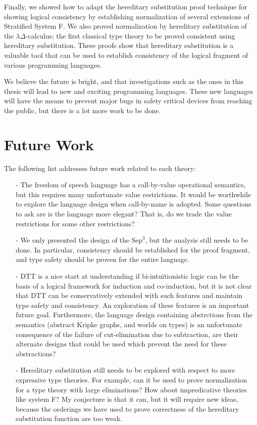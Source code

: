 \documentclass[phd,appendix,dedicationpage,ackpage,epigraphpage]{uithesis}
\newcommand{\Sep}[0]{\text{Sep}^3}
\begin{document}
Finally, we showed how to adapt the hereditary substitution proof
technique for showing logical consistency by establishing
normalization of several extensions of Stratified System F.  We also
proved normalization by hereditary substitution of the
$\lambda\Delta$-calculus; the first classical type theory to be proved
consistent using hereditary substitution.  These proofs show that
hereditary substitution is a valuable tool that can be used to
establish consistency of the logical fragment of various programming
languages.

We believe the future is bright, and that investigations such as the
ones in this thesis will lead to new and exciting programming
languages.  These new languages will have the means to prevent major
bugs in safety critical devices from reaching the public, but there is
a lot more work to be done.

\section{Future Work}
\label{sec:future_work}
The following list addresses future work related to each theory:
\begin{itemize}
\item[-] The freedom of speech language has a call-by-value
  operational semantics, but this requires many unfortunate value
  restrictions.  It would be worthwhile to explore the language design
  when call-by-name is adopted.  Some questions to ask are is the
  language more elegant?  That is, do we trade the value restrictions
  for some other restrictions?

\item[-] We only presented the design of the $\Sep$, but the analysis
  still needs to be done.  In particular, consistency should be
  established for the proof fragment, and type safety should be proven
  for the entire language.

\item[-] DTT is a nice start at understanding if bi-intuitionistic
  logic can be the basis of a logical framework for induction and
  co-induction, but it is not clear that DTT can be conservatively
  extended with such features and maintain type safety and
  consistency.  An exploration of these features is an important
  future goal.  Furthermore, the language design containing
  abstrctions from the semantics (abstract Kripke graphs, and worlds
  on types) is an unfortunate consequence of the failure of
  cut-elimination due to subtraction, are their alternate designs that
  could be used which prevent the need for these abstractions?

\item[-] Hereditary substitution still needs to be explored with
  respect to more expressive type theories.  For example, can it be
  used to prove normalization for a type theory with large
  eliminations?  How about impredicative theories like system F?  My
  conjecture is that it can, but it will require new ideas, because
  the orderings we have used to prove correctness of the hereditary
  substitution function are too weak.
\end{itemize}
\end{document}
